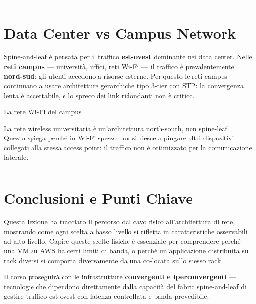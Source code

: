 \documentclass[
  italian,
  openany]{book}
\begin{document}
\begin{center}\rule{0.5\linewidth}{0.5pt}\end{center}

\section{Data Center vs Campus
Network}\label{data-center-vs-campus-network}

Spine-and-leaf è pensata per il traffico \textbf{est-ovest} dominante
nei data center. Nelle \textbf{reti campus} --- università, uffici, reti
Wi-Fi --- il traffico è prevalentemente \textbf{nord-sud}: gli utenti
accedono a risorse esterne. Per questo le reti campus continuano a usare
architetture gerarchiche tipo 3-tier con STP: la convergenza lenta è
accettabile, e lo spreco dei link ridondanti non è critico.

\begin{calloutnote}{La rete Wi-Fi del campus}

La rete wireless universitaria è un'architettura north-south, non
spine-leaf. Questo spiega perché in Wi-Fi spesso non si riesce a pingare
altri dispositivi collegati alla stessa access point: il traffico non è
ottimizzato per la comunicazione laterale.

\end{calloutnote}

\begin{center}\rule{0.5\linewidth}{0.5pt}\end{center}

\section{Conclusioni e Punti Chiave}\label{conclusioni-e-punti-chiave}

Questa lezione ha tracciato il percorso dal cavo fisico all'architettura
di rete, mostrando come ogni scelta a basso livello si rifletta in
caratteristiche osservabili ad alto livello. Capire queste scelte
fisiche è essenziale per comprendere perché una VM su AWS ha certi
limiti di banda, o perché un'applicazione distribuita su rack diversi si
comporta diversamente da una co-locata sullo stesso rack.

Il corso proseguirà con le infrastrutture \textbf{convergenti e
iperconvergenti} --- tecnologie che dipendono direttamente dalla
capacità del fabric spine-and-leaf di gestire traffico est-ovest con
latenza controllata e banda prevedibile.
\end{document}
